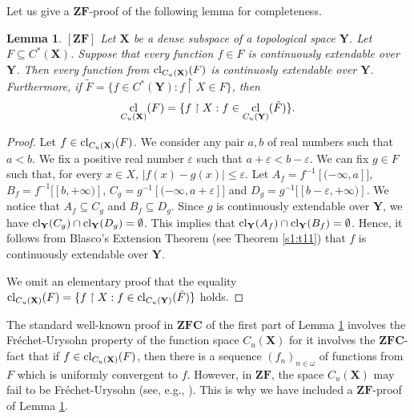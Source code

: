 \documentclass[12pt,twoside,leqno]{article}
\theoremstyle{plain}
\newtheorem{lemma}[theorem]{Lemma}
\theoremstyle{definition}
\theoremstyle{remark}
\DeclareMathOperator{\cl}{{\rm cl}}
\begin{document}
Let us give a $\mathbf{ZF}$-proof of the following lemma for completeness.

\begin{lemma}
	\label{s2:l15}
	$[\mathbf{ZF}]$
	Let $\mathbf{X}$ be a dense subspace of a topological space $\mathbf{Y}$. Let $F\subseteq C^{\ast}(\mathbf{X})$. Suppose that every function $f\in F$ is continuously extendable over $\mathbf{Y}$. Then every function from $\cl_{C_{u}(\mathbf{X})}(F)$ is continuosly extendable over $\mathbf{Y}$. Furthermore, if $\tilde{F}=\{f\in C^{\ast}(\mathbf{Y}): f\upharpoonright X\in F\}$, then
	$$\cl_{C_{u}(\mathbf{X})}(F)=\{f\upharpoonright X: f\in\cl_{C_{u}(\mathbf{Y})}(\tilde{F})\}.$$
\end{lemma}

\begin{proof} Let $f\in \cl_{C_{u}(\mathbf{X})}(F)$. We consider any pair $a,b$ of real numbers such that $a<b$. We fix a positive real number $\varepsilon$ such that $a+\varepsilon<b-\varepsilon$. We can fix $g\in F$ such that, for every $x\in X$, $|f(x)-g(x)|\leq\varepsilon$. Let $A_f=f^{-1}[(-\infty, a]]$, $B_f=f^{-1}[[b, +\infty)]$, $C_g=g^{-1}[(-\infty, a+\varepsilon]]$ and $D_g=g^{-1}[[b-\varepsilon, +\infty)]$. We notice that $A_f\subseteq C_g$ and $B_f\subseteq D_g$. Since $g$ is continuously extendable over $\mathbf{Y}$, we have $\cl_{\mathbf{Y}}(C_g)\cap\cl_{\mathbf{Y}}(D_g)=\emptyset$. This implies that $\cl_{\mathbf{Y}}(A_f)\cap\cl_{\mathbf{Y}}(B_f)=\emptyset$. Hence, it follows from Blasco's Extension Theorem (see Theorem \ref{s1:t11}) that $f$ is continuously extendable over $\mathbf{Y}$. 
	
	We omit an elementary proof that the equality $\cl_{C_{u}(\mathbf{X})}(F)=\{f\upharpoonright X: f\in\cl_{C_{u}(\mathbf{Y})}(\tilde{F})\}$ holds.
\end{proof}

The standard well-known proof in $\mathbf{ZFC}$ of the first part of Lemma \ref{s2:l15} involves the Fr\'echet-Urysohn property of the function space $C_{u}(\mathbf{X})$ for it involves the $\mathbf{ZFC}$-fact that if $f\in \cl_{C_{u}(\mathbf{X})}(F)$, then there is a sequence $(f_n)_{n\in\omega}$ of functions from $F$ which is uniformly convergent to $f$. However, in $\mathbf{ZF}$, the space $C_{u}(\mathbf{X})$ may  fail to be Fr\'echet-Urysohn (see, e.g., \cite[Theorem 4.54]{her}). This is why we have included a $\mathbf{ZF}$-proof of Lemma \ref{s2:l15}.  
\end{document}
